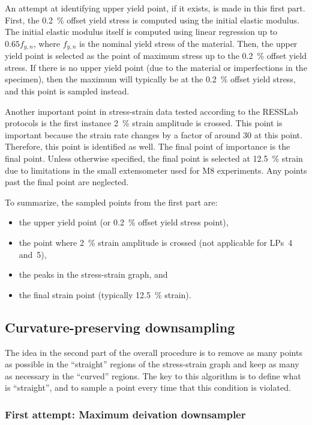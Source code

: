 \documentclass[a4paper,11pt]{article}
\begin{document}
An attempt at identifying upper yield point, if it exists, is made in this first part.
First, the 0.2~\% offset yield stress is computed using the initial elastic modulus.
The initial elastic modulus itself is computed using linear regression up to $0.65 f_{y,n}$, where $f_{y,n}$ is the nominal yield stress of the material.
Then, the upper yield point is selected as the point of maximum stress up to the 0.2~\% offset yield stress.
If there is no upper yield point (due to the material or imperfections in the specimen), then the maximum will typically be at the 0.2~\% offset yield stress, and this point is sampled instead.

Another important point in stress-strain data tested according to the RESSLab protocols is the first instance 2~\% strain amplitude is crossed.
This point is important because the strain rate changes by a factor of around 30 at this point.
Therefore, this point is identified as well.
The final point of importance is the final point.
Unless otherwise specified, the final point is selected at 12.5~\% strain due to limitations in the small extensometer used for M8 experiments.
Any points past the final point are neglected.

To summarize, the sampled points from the first part are:
\begin{itemize}
    \item the upper yield point (or 0.2~\% offset yield stress point),
    \item the point where 2~\% strain amplitude is crossed (not applicable for LPs~4 and~5),
    \item the peaks in the stress-strain graph, and
    \item the final strain point (typically 12.5~\% strain).
\end{itemize}

\subsection{Curvature-preserving downsampling}

The idea in the second part of the overall procedure is to remove as many points as possible in the ``straight'' regions of the stress-strain graph and keep as many as necessary in the ``curved'' regions.
The key to this algorithm is to define what is ``straight'', and to sample a point every time that this condition is violated.

\subsubsection{First attempt: Maximum deivation downsampler}
\end{document}
